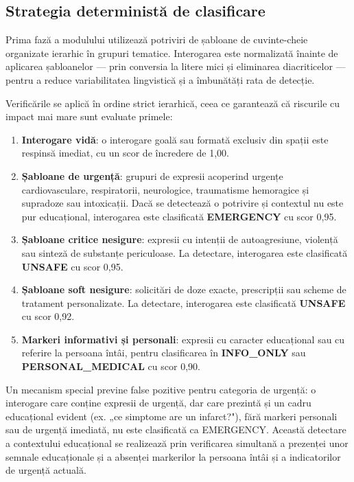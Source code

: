 \documentclass[12pt, a4paper, oneside, romanian]{teza-upb}
\begin{document}
\subsection{Strategia deterministă de clasificare}

Prima fază a modulului utilizează potriviri de șabloane de cuvinte-cheie organizate ierarhic în grupuri tematice. Interogarea este normalizată înainte de aplicarea șabloanelor — prin conversia la litere mici și eliminarea diacriticelor — pentru a reduce variabilitatea lingvistică și a îmbunătăți rata de detecție.

Verificările se aplică în ordine strict ierarhică, ceea ce garantează că riscurile cu impact mai mare sunt evaluate primele:

\begin{enumerate}
    \item \textbf{Interogare vidă}: o interogare goală sau formată exclusiv din spații este respinsă imediat, cu un scor de încredere de 1,00.
    \item \textbf{Șabloane de urgență}: grupuri de expresii acoperind urgențe cardiovasculare, respiratorii, neurologice, traumatisme hemoragice și supradoze sau intoxicații. Dacă se detectează o potrivire și contextul nu este pur educațional, interogarea este clasificată \textbf{EMERGENCY} cu scor 0,95.
    \item \textbf{Șabloane critice nesigure}: expresii cu intenții de autoagresiune, violență sau sinteză de substanțe periculoase. La detectare, interogarea este clasificată \textbf{UNSAFE} cu scor 0,95.
    \item \textbf{Șabloane soft nesigure}: solicitări de doze exacte, prescripții sau scheme de tratament personalizate. La detectare, interogarea este clasificată \textbf{UNSAFE} cu scor 0,92.
    \item \textbf{Markeri informativi și personali}: expresii cu caracter educațional sau cu referire la persoana întâi, pentru clasificarea în \textbf{INFO\_ONLY} sau \textbf{PERSONAL\_MEDICAL} cu scor 0,90.
\end{enumerate}

Un mecanism special previne false pozitive pentru categoria de urgență: o interogare care conține expresii de urgență, dar care prezintă și un cadru educațional evident (ex. „ce simptome are un infarct?"), fără markeri personali sau de urgență imediată, nu este clasificată ca EMERGENCY. Această detectare a contextului educațional se realizează prin verificarea simultană a prezenței unor semnale educaționale și a absenței markerilor la persoana întâi și a indicatorilor de urgență actuală.
\end{document}
